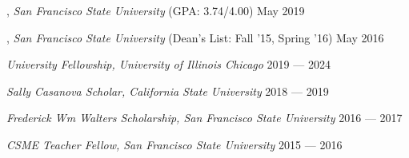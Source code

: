 
, \textit{San Francisco State University} (GPA: 3.74/4.00)	\hfill May 2019

, \textit{San Francisco State University} (Dean's List: Fall '15, Spring '16) \hfill	May 2016

\textit{University Fellowship, University of Illinois Chicago} 	\hfill 2019 --- 2024

\textit{Sally Casanova Scholar, California State University} \hfill	2018 --- 2019

\textit{Frederick Wm Walters Scholarship, San Francisco State University}	\hfill 2016 --- 2017

\textit{CSME Teacher Fellow, San Francisco State University} \hfill	2015 --- 2016


